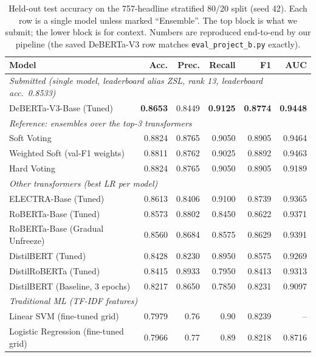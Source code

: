 \documentclass[10pt]{article}
\begin{document}
\begin{table}[t]
\centering
\caption{Held-out test accuracy on the 757-headline stratified 80/20 split (seed 42). Each row is a single model unless marked ``Ensemble''. The top block is what we submit; the lower block is for context. Numbers are reproduced end-to-end by our pipeline (the saved DeBERTa-V3 row matches \texttt{eval\_project\_b.py} exactly).}
\label{tab:results}
\small
\begin{tabular}{l rrrrr}
\toprule
\textbf{Model} & \textbf{Acc.} & \textbf{Prec.} & \textbf{Recall} & \textbf{F1} & \textbf{AUC} \\
\midrule
\multicolumn{6}{l}{\textit{Submitted (single model, leaderboard alias ZSL, rank 13, leaderboard acc.~0.8533)}} \\
DeBERTa-V3-Base (Tuned)              & \textbf{0.8653} & 0.8449 & \textbf{0.9125} & \textbf{0.8774} & \textbf{0.9448} \\
\midrule
\multicolumn{6}{l}{\textit{Reference: ensembles over the top-3 transformers}} \\
Soft Voting                           & 0.8824 & 0.8765 & 0.9050 & 0.8905 & 0.9464 \\
Weighted Soft (val-F1 weights)        & 0.8811 & 0.8762 & 0.9025 & 0.8892 & 0.9463 \\
Hard Voting                           & 0.8824 & 0.8765 & 0.9050 & 0.8905 & 0.9189 \\
\midrule
\multicolumn{6}{l}{\textit{Other transformers (best LR per model)}} \\
ELECTRA-Base (Tuned)                  & 0.8613 & 0.8406 & 0.9100 & 0.8739 & 0.9365 \\
RoBERTa-Base (Tuned)                  & 0.8573 & 0.8802 & 0.8450 & 0.8622 & 0.9371 \\
RoBERTa-Base (Gradual Unfreeze)       & 0.8560 & 0.8684 & 0.8575 & 0.8629 & 0.9391 \\
DistilBERT (Tuned)                    & 0.8428 & 0.8230 & 0.8950 & 0.8575 & 0.9269 \\
DistilRoBERTa (Tuned)                 & 0.8415 & 0.8933 & 0.7950 & 0.8413 & 0.9313 \\
DistilBERT (Baseline, 3 epochs)       & 0.8217 & 0.8650 & 0.7850 & 0.8231 & 0.9097 \\
\midrule
\multicolumn{6}{l}{\textit{Traditional ML (TF-IDF features)}} \\
Linear SVM (fine-tuned grid)          & 0.7979 & 0.76   & 0.90   & 0.8239 & --     \\
Logistic Regression (fine-tuned grid) & 0.7966 & 0.77   & 0.89   & 0.8218 & 0.8716 \\

\end{tabular}
\end{table}
\end{document}

